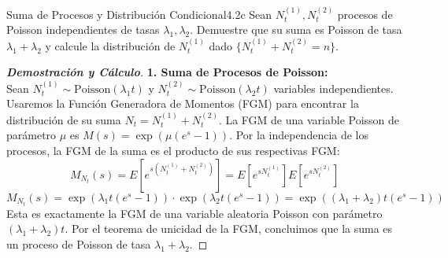 \documentclass[10pt,a4paper]{article}
\begin{document}
\newpage

\begin{ejercicio}{Suma de Procesos y Distribución Condicional}{4.2c}
    Sean $N_t^{(1)}, N_t^{(2)}$ procesos de Poisson independientes de tasas $\lambda_1, \lambda_2$. Demuestre que su suma es Poisson de tasa $\lambda_1 + \lambda_2$ y calcule la distribución de $N_t^{(1)}$ dado $\{N_t^{(1)} + N_t^{(2)} = n\}$.
\end{ejercicio}

\vspace{2mm}

\begin{proof}[\textbf{Demostración y Cálculo}]
    \textbf{1. Suma de Procesos de Poisson:} \\
    Sean $N_t^{(1)} \sim \text{Poisson}(\lambda_1 t)$ y $N_t^{(2)} \sim \text{Poisson}(\lambda_2 t)$ variables independientes. Usaremos la Función Generadora de Momentos (FGM) para encontrar la distribución de su suma $N_t = N_t^{(1)} + N_t^{(2)}$.
    La FGM de una variable Poisson de parámetro $\mu$ es $M(s) = \exp(\mu(e^s - 1))$.
    Por la independencia de los procesos, la FGM de la suma es el producto de sus respectivas FGM:
    \[ M_{N_t}(s) = E[e^{s(N_t^{(1)} + N_t^{(2)})}] = E[e^{sN_t^{(1)}}] E[e^{sN_t^{(2)}}] \]
    \[ M_{N_t}(s) = \exp(\lambda_1 t (e^s - 1)) \cdot \exp(\lambda_2 t (e^s - 1)) = \exp((\lambda_1 + \lambda_2)t(e^s - 1)) \]
    Esta es exactamente la FGM de una variable aleatoria Poisson con parámetro $(\lambda_1 + \lambda_2)t$. Por el teorema de unicidad de la FGM, concluimos que la suma es un proceso de Poisson de tasa $\lambda_1 + \lambda_2$.


\end{proof}
\end{document}
